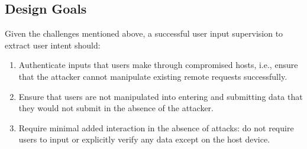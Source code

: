 \subsection{Design Goals}
\label{sec:systemDesign:designgolaks}

 Given the challenges mentioned above, a successful user input supervision to extract user intent should:

\begin{enumerate}
	\item Authenticate inputs that users make through compromised hosts, i.e., ensure that the attacker cannot manipulate existing remote requests successfully.

	\item Ensure that users are not manipulated into entering and submitting data that they would not submit in the absence of the attacker.

	\item Require minimal added interaction in the absence of attacks: do not require users to input or explicitly verify any data except on the host device.
\end{enumerate}